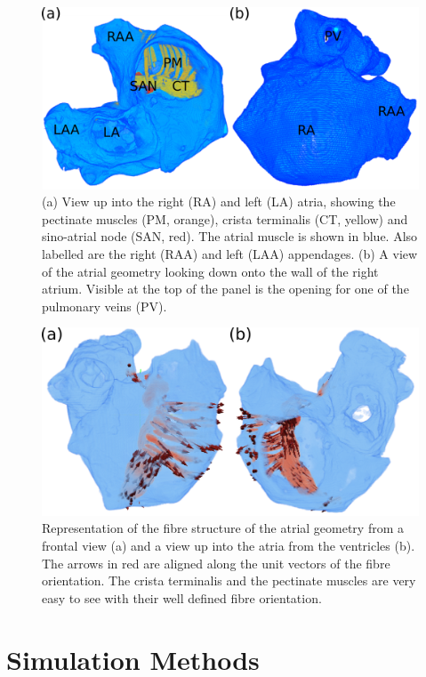 \begin{figure}
\includegraphics{figures/atrium/structure/atrial_geometry}
\caption[Atrial Geometry]{
\label{atrium:geometry}
(a)
View up into the right (RA) and left (LA) atria, showing the pectinate muscles
(PM, orange), crista terminalis (CT, yellow) and sino-atrial node (SAN, red).
The atrial muscle is shown in blue.
Also labelled are the right (RAA) and left (LAA) appendages.
(b)
A view of the atrial geometry looking down onto the wall of the right
atrium.  Visible at the top of the panel is the opening for one of the pulmonary
veins (PV).
}
\end{figure}

\begin{figure}
\includegraphics{figures/atrium/structure/fibres}
\caption[Atrial Fibre Structure]{
\label{atrium:fibres}
Representation of the fibre structure of the atrial geometry from a frontal
view (a) and a view up into the atria from the ventricles (b).
The arrows in red are aligned along the unit vectors of the fibre orientation.
The crista terminalis and the pectinate muscles are very easy to see with their
well defined fibre orientation.
}
\end{figure}

\section{Simulation Methods}
\label{atrium:sec:model}

